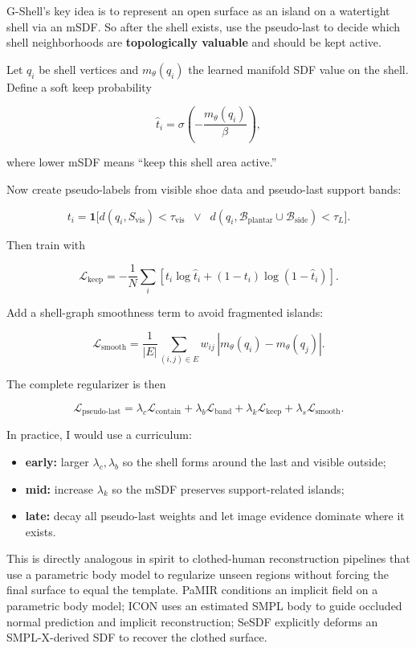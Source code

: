\documentclass[
  10.5pt,
]{article}
\providecommand{\tightlist}{%
  \setlength{\itemsep}{0pt}\setlength{\parskip}{0pt}}
\begin{document}
G-Shell's key idea is to represent an open surface as an island on a
watertight shell via an mSDF. So after the shell exists, use the
pseudo-last to decide which shell neighborhoods are
\textbf{topologically valuable} and should be kept active.

Let \(q_i\) be shell vertices and \(m_\theta(q_i)\) the learned manifold
SDF value on the shell. Define a soft keep probability

\[
\hat t_i = \sigma\!\left(-\frac{m_\theta(q_i)}{\beta}\right),
\]

where lower mSDF means ``keep this shell area active.''

Now create pseudo-labels from visible shoe data and pseudo-last support
bands:

\[
t_i
=
\mathbf 1\Big[
d(q_i,S_{\text{vis}})<\tau_{\text{vis}}
\;\;\lor\;\;
d(q_i,\mathcal B_{\text{plantar}}\cup\mathcal B_{\text{side}})<\tau_L
\Big].
\]

Then train with

\[
\mathcal L_{\text{keep}}
=
-\frac{1}{N}\sum_i
\left[
t_i \log \hat t_i + (1-t_i)\log(1-\hat t_i)
\right].
\]

Add a shell-graph smoothness term to avoid fragmented islands:

\[
\mathcal L_{\text{smooth}}
=
\frac{1}{|E|}\sum_{(i,j)\in E}
w_{ij}\,|m_\theta(q_i)-m_\theta(q_j)|.
\]

The complete regularizer is then

\[
\mathcal L_{\text{pseudo-last}}
=
\lambda_c \mathcal L_{\text{contain}}
+\lambda_b \mathcal L_{\text{band}}
+\lambda_k \mathcal L_{\text{keep}}
+\lambda_s \mathcal L_{\text{smooth}}.
\]

In practice, I would use a curriculum:

\begin{itemize}
\tightlist
\item
  \textbf{early:} larger \(\lambda_c,\lambda_b\) so the shell forms
  around the last and visible outside;
\item
  \textbf{mid:} increase \(\lambda_k\) so the mSDF preserves
  support-related islands;
\item
  \textbf{late:} decay all pseudo-last weights and let image evidence
  dominate where it exists.
\end{itemize}

This is directly analogous in spirit to clothed-human reconstruction
pipelines that use a parametric body model to regularize unseen regions
without forcing the final surface to equal the template. PaMIR
conditions an implicit field on a parametric body model; ICON uses an
estimated SMPL body to guide occluded normal prediction and implicit
reconstruction; SeSDF explicitly deforms an SMPL-X-derived SDF to
recover the clothed surface.
\end{document}
